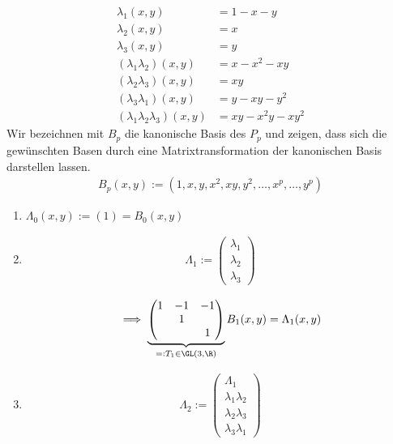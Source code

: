 
\begin{solution}

\begin{align*}
  \lambda_1(x, y) & = 1 - x - y \\
  \lambda_2(x, y) & = x \\
  \lambda_3(x, y) & = y \\
  (\lambda_1 \lambda_2)(x, y) & = x - x^2 - xy \\
  (\lambda_2 \lambda_3)(x, y) & = xy \\
  (\lambda_3 \lambda_1)(x, y) & = y - xy - y^2 \\
  (\lambda_1 \lambda_2 \lambda_3)(x, y) & = xy - x^2 y - x y^2
\end{align*}
Wir bezeichnen mit $B_p$ die kanonische Basis des $P_p$ und zeigen, dass
sich die gewünschten Basen durch eine Matrixtransformation der kanonischen Basis
darstellen lassen.
\begin{align*}
  B_p(x, y) := (1, x, y, x^2, xy, y^2, \dots, x^p, \dots, y^p)
\end{align*}

\begin{enumerate}[label = \textbf{\alph*)}]

  \item $\Lambda_0(x,y) := (1) = B_0(x,y)$
  \item

  \begin{align*}
    \Lambda_1
    :=
    \begin{pmatrix}
      \lambda_1 \\
      \lambda_2 \\
      \lambda_3
    \end{pmatrix}
  \end{align*}

  \begin{align*}
    \implies
    \underbrace
    {
      \begin{pmatrix}
        1 & -1 & -1 \\
          &  1 &    \\
          &    &  1
      \end{pmatrix}
    }_{
      =: T_1 \in \GL(3, \R)
    }
    B_1(x, y)
    =
    \Lambda_1(x, y)
  \end{align*}

  \item

  \begin{align*}
    \Lambda_2
    :=
    \begin{pmatrix}
      \Lambda_1 \\
      \lambda_1 \lambda_2 \\
      \lambda_2 \lambda_3 \\
      \lambda_3 \lambda_1
    \end{pmatrix}
  \end{align*}


\end{enumerate}
\end{solution}
